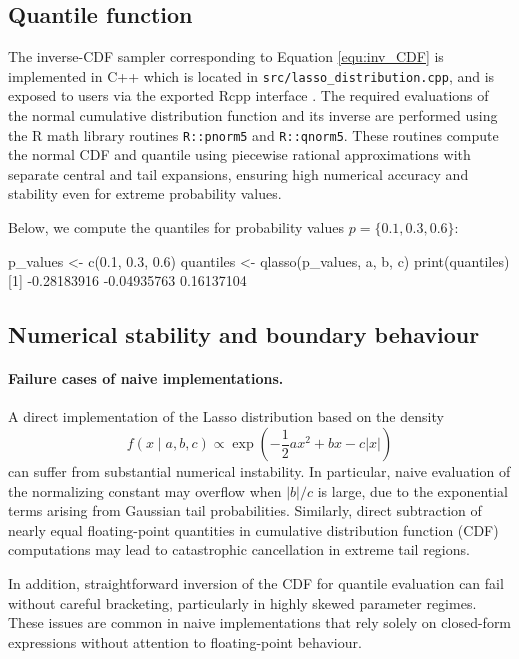\subsection{Quantile function}
The inverse-CDF sampler corresponding to Equation \eqref{equ:inv_CDF} is implemented in C++ which is located in \texttt{src/lasso\_distribution.cpp}, and is exposed to users via the exported Rcpp interface . The required evaluations of the normal cumulative distribution function 
and its inverse are performed using the R math library routines 
\texttt{R::pnorm5} and \texttt{R::qnorm5}. These routines compute the 
normal CDF and quantile using piecewise rational approximations with 
separate central and tail expansions, ensuring high 
numerical accuracy and stability even for extreme probability values.





Below, we compute the quantiles for probability values \textbf{$p = \{0.1, 0.3, 0.6\}$}:

\begin{example}
p_values <- c(0.1, 0.3, 0.6)
quantiles <- qlasso(p_values, a, b, c)
print(quantiles)
[1] -0.28183916 -0.04935763  0.16137104
\end{example}





\subsection{Numerical stability and boundary behaviour}
\label{sec:numerical_validation}

\paragraph{Failure cases of naive implementations.}
A direct implementation of the Lasso distribution based on the density
\[
f(x \mid a,b,c) \propto \exp\!\left(-\frac{1}{2}ax^2 + bx - c|x|\right)
\]
can suffer from substantial numerical instability. In particular, naive evaluation of the normalizing constant may overflow when $|b|/c$ is large, due to the exponential terms arising from Gaussian tail probabilities. Similarly, direct subtraction of nearly equal floating-point quantities in cumulative distribution function (CDF) computations may lead to catastrophic cancellation in extreme tail regions. 

In addition, straightforward inversion of the CDF for quantile evaluation can fail without careful bracketing, particularly in highly skewed parameter regimes. These issues are common in naive implementations that rely solely on closed-form expressions without attention to floating-point behaviour.

